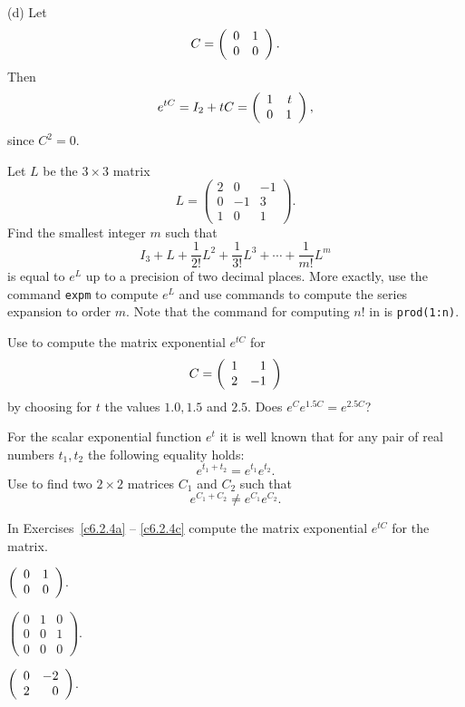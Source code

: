 \noindent (d) \quad Let
\[
C = \left(\begin{array}{rr} 0 & 1\\ 0 &0\end{array}\right).
\]
Then
\begin{equation}  \label{e:nilpotent}
e^{tC} = I_2 + tC = \left(\begin{array}{rr} 1 & t\\ 0 &1\end{array}\right),
\end{equation}
since $C^2=0$.

\EXER

\CEXER

\begin{exercise} \label{c6.2.1}
Let $L$ be the $3\times 3$ matrix
\[
     L = \left(\begin{array}{rrr}
    2 & 0 & -1\\
    0 & -1 & 3\\
    1 & 0 & 1
               \end{array}\right).
\]
Find the smallest integer $m$ such that
\[
  I_3+L+\frac{1}{2!} L^2 + \frac{1}{3!} L^3 + \cdots
  + \frac{1}{m!} L^m
\]
is equal to $e^L$ up to a precision of two decimal places.  More
exactly, use the \Matlab command {\tt expm} to compute $e^L$ and
use \Matlab commands to compute the series expansion to order $m$.  Note
that the command for computing $n!$ in \Matlab is
{\tt prod(1:n)}.
\end{exercise}

\begin{exercise} \label{c6.2.2}
Use \Matlab to compute the matrix exponential $e^{tC}$ for
\[
     C =\left(\begin{array}{rr} 1 & 1\\ 2 &-1\end{array}\right)
\]
by choosing for $t$ the values $1.0,1.5$ and $2.5$.  Does $e^{C}
e^{1.5C}=e^{2.5C}$?
\end{exercise}

\begin{exercise} \label{c6.2.3}
For the scalar exponential function $e^{t}$ it is well known
that for any pair of real numbers $t_1,t_2$ the following
equality holds:
\[
     e^{t_1+t_2} = e^{t_1}e^{t_2}.
\]
Use \Matlab to find two $2\times 2$ matrices $C_1$ and $C_2$ such that
\[
     e^{C_1+C_2} \not= e^{C_1}e^{C_2}.
\]
\end{exercise}

\TEXER

\noindent In Exercises~\ref{c6.2.4a} -- \ref{c6.2.4c} compute the matrix
exponential $e^{tC}$ for the matrix.
\begin{exercise} \label{c6.2.4a}
                $\left(\begin{array}{rr} 0 & 1\\ 0 &0\end{array}\right)$.
\end{exercise}
\begin{exercise} \label{c6.2.4b}
                $\left(\begin{array}{ccc}
                0 & 1 & 0\\
                0 & 0 & 1\\
                0 & 0 & 0 \end{array}\right)$.
\end{exercise}
\begin{exercise} \label{c6.2.4c}
                $\left(\begin{array}{rr} 0 & -2\\ 2 &0\end{array}\right)$.
\end{exercise}

